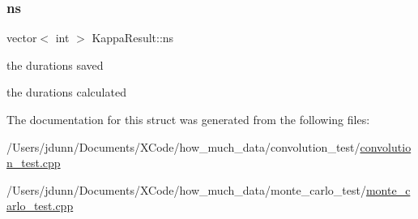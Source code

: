 \subsubsection{\texorpdfstring{ns}{ns}}
{\footnotesize\ttfamily vector$<$ int $>$ Kappa\+Result\+::ns}



the durations saved 

the durations calculated 

The documentation for this struct was generated from the following files\+:\begin{DoxyCompactItemize}
\item 
/\+Users/jdunn/\+Documents/\+X\+Code/how\+\_\+much\+\_\+data/convolution\+\_\+test/\mbox{\hyperlink{convolution__test_8cpp}{convolution\+\_\+test.\+cpp}}\item 
/\+Users/jdunn/\+Documents/\+X\+Code/how\+\_\+much\+\_\+data/monte\+\_\+carlo\+\_\+test/\mbox{\hyperlink{monte__carlo__test_8cpp}{monte\+\_\+carlo\+\_\+test.\+cpp}}\end{DoxyCompactItemize}

